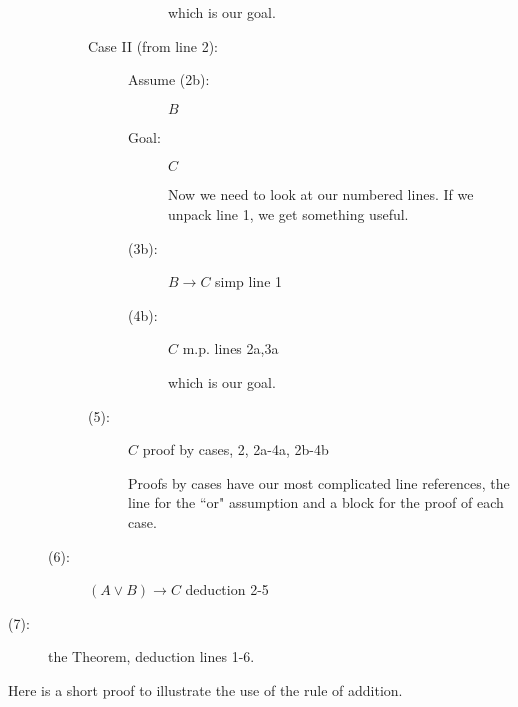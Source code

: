 \documentclass[12pt]{article}
\begin{document}
\begin{description}
\begin{description}
\begin{description}
\begin{description}
which is our goal.

\end{description}

\item[Case II (from line 2):]

\begin{description}

\item[Assume (2b):]  $B$

\item[Goal:]  $C$

Now we need to look at our numbered lines.  If we unpack line 1, we get something useful.

\item[(3b):]  $B \rightarrow C$ simp line 1

\item[(4b):]  $C$ m.p. lines 2a,3a

which is our goal.

\end{description}

\item [(5):]  $C$ proof by cases, 2, 2a-4a, 2b-4b

Proofs by cases have our most complicated line references, the line for the ``or" assumption
and a block for the proof of each case.

\end{description}

\item[(6):]  $(A \vee B) \rightarrow C$  deduction 2-5

\end{description}

\item[(7):]  the Theorem, deduction lines 1-6.

\end{description}

Here is a short proof to illustrate the use of the rule of addition.
\end{document}
